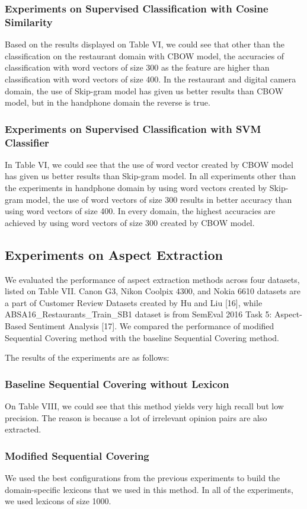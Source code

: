 \documentclass[a4paper,conference]{IEEEtran}
\begin{document}
\subsubsection{Experiments on Supervised Classification with Cosine Similarity}
Based on the results displayed on Table VI, we could see that other than the classification on the restaurant domain with CBOW model, the accuracies of classification with word vectors of size 300 as the feature are higher than classification with word vectors of size 400. In the restaurant and digital camera domain, the use of Skip-gram model has given us better results than CBOW model, but in the handphone domain the reverse is true. 

\subsubsection{Experiments on Supervised Classification with SVM Classifier}
In Table VI, we could see that the use of word vector created by CBOW model has given us better results than Skip-gram model. In all experiments other than the experiments in handphone domain by using word vectors created by Skip-gram model, the use of word vectors of size 300 results in better accuracy than using word vectors of size 400. In every domain, the highest accuracies are achieved by using word vectors of size 300 created by CBOW model.  

\subsection{Experiments on Aspect Extraction}
We evaluated the performance of aspect extraction methods across four datasets, listed on Table VII. Canon G3, Nikon Coolpix 4300, and Nokia 6610 datasets are a part of Customer Review Datasets created by Hu and Liu [16], while ABSA16\_Restaurants\_Train\_SB1 dataset is from SemEval 2016 Task 5: Aspect-Based Sentiment Analysis [17]. We compared the performance of modified Sequential Covering method with the baseline Sequential Covering method.

The results of the experiments are as follows:
\subsubsection{Baseline Sequential Covering without Lexicon}
On Table VIII, we could see that this method yields very high recall but low precision. The reason is because a lot of irrelevant opinion pairs are also extracted.
\subsubsection{Modified Sequential Covering}
We used the best configurations from the previous experiments to build the domain-specific lexicons that we used in this method. In all of the experiments, we used lexicons of size 1000.
\end{document}

